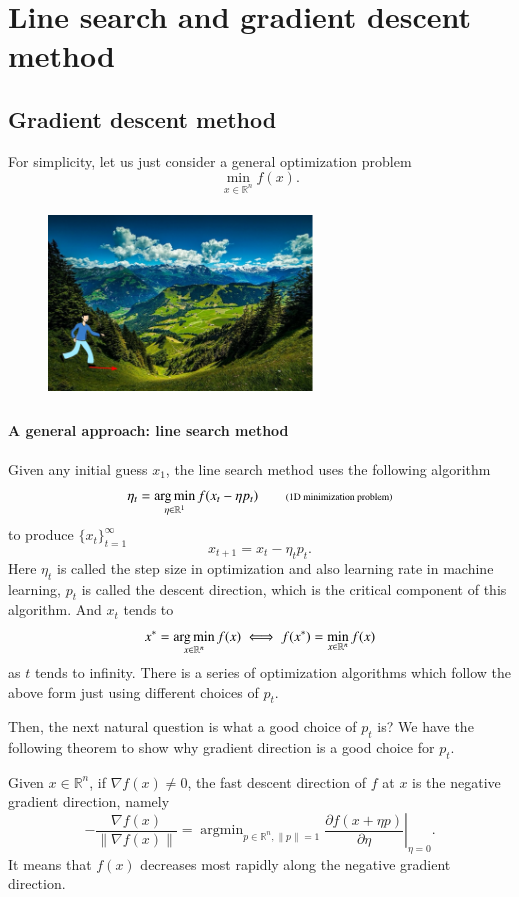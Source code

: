 \section{Line search and gradient descent method}
\subsection{Gradient descent method}
For simplicity, let us just consider a general optimization problem
\begin{equation}\label{optmodel}
\min_{x\in \mathbb{R}^n } f(x).
\end{equation}

\begin{figure}[H] 
	\centering
	\centering\includegraphics[height = 5cm, width=7cm]{figures/diag_GD.png} 
\end{figure}


\paragraph{A general approach:  line search method}
Given any initial guess $x_1$, the line search method uses the following algorithm
$$
\eta_t=\operatorname*{arg\,min}_{\eta\in \mathbb{R}^1} f(x_t - \eta p_t)\qquad \mbox{\scriptsize(1D minimization problem)}
$$ 
 to produce $\{ x_{t}\}_{t=1}^{\infty}$
\begin{equation}\label{line-search}
x_{t+1} = x_{t} - \eta_t p_t.
\end{equation}
Here $\eta_t$ is called the step size in optimization and also learning
rate in machine learning, $p_t$ is called the descent direction, which
is the critical component of this algorithm. And $x_t$ tends to 
$$
x^*=\operatorname*{arg\,min}_{x\in \mathbb{R}^n} f(x) \iff f(x^*)=\min_{x\in \mathbb{R}^n} f(x)
$$ 
as $t$ tends to infinity. There is a series of optimization
algorithms which follow the above form just using different choices of $p_t$.

Then, the next natural question is what a good choice of $p_t$ is? 
We have the following theorem to show why gradient direction is a good choice for $p_t$.
\begin{lemma}
Given  $x \in \mathbb{R}^n$, if $\nabla f(x)\neq 0$, the fast descent direction of $f$ at $x$ is the negative gradient direction, namely
\begin{equation}\label{key}
-\frac{\nabla f(x)}{\|\nabla f(x)\|} = \mathop{\arg\min}_{ p \in \mathbb{R}^n, \|p\|=1} \left. \frac{\partial f(x + \eta p)}{\partial \eta} \right|_{\eta=0}.
\end{equation}
It means that $f(x)$ decreases most rapidly along the negative gradient direction.
\end{lemma}
 
